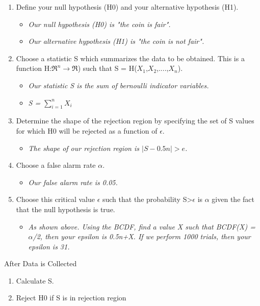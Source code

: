\begin{enumerate}
\item Define your null hypothesis (H0) and your alternative hypothesis (H1).
\begin{itemize}
	\item \textit{Our null hypothesis (H0) is "the coin is fair".}
	\item \textit{Our alternative hypothesis (H1) is "the coin is not fair".}
\end{itemize}
\item Choose a statistic S which summarizes the data to be obtained. This is a function H:$\Re^n$$\rightarrow$$\Re$) such that S = H($X_1$,$X_2$,....,$X_n$).
\begin{itemize}
	\item \textit{Our statistic S is the sum of bernoulli indicator variables.}
    \item \textit{S = $\sum\limits_{i=1}^n X_i$}
\end{itemize}
\item Determine the shape of the rejection region by specifying the set of S values for which H0 will be rejected as a function of $\epsilon$.
\begin{itemize}
	\item \textit{The shape of our rejection region is $|S-0.5n|>e$.}
\end{itemize}
\item Choose a false alarm rate $\alpha$.
\begin{itemize}
	\item \textit{Our false alarm rate is 0.05.}
\end{itemize}
\item Choose this critical value $\epsilon$ such that the probability S>$\epsilon$ is $\alpha$ given the fact that the null hypothesis is true.
\begin{itemize}
	\item \textit{As shown above. Using the BCDF, find a value X such that BCDF(X) = $\alpha$/2, then your epsilon is 0.5n+X. If we perform 1000 trials, then your epsilon is 31.}
\end{itemize}
\end{enumerate}

After Data is Collected

\begin{enumerate}
\item Calculate S.
\item Reject H0 if S is in rejection region
\end{enumerate}

